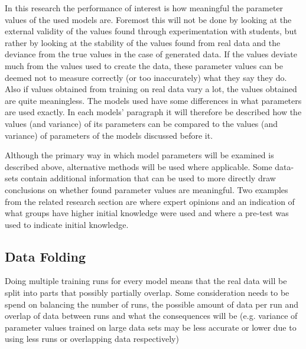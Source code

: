 \documentclass{article}
\begin{document}
\begin{comment}
Since the learner models are also used as an approximation of how students learn and as such influence decisions made on what exercises are given to a student, what exercises are included in general and what topics require more attention, the validity of the specific parameters of the model need to taken into account. In this research external validity (e.g. see if the parameter settings seem realistic) is not the concern, but rather whether the found parameters are consistent over multiple trainings of the model and (in the case of generated data) whether the training algorithm recovers the used parameters correctly.
\end{comment}

In this research the performance of interest is how meaningful the parameter values of the used models are. Foremost this will not be done by looking at the external validity of the values found through experimentation with students, but rather by looking at the stability of the values found from real data and the deviance from the true values in the case of generated data. If the values deviate much from the values used to create the data, these parameter values can be deemed not to measure correctly (or too inaccurately) what they say they do. Also if values obtained from training on real data vary a lot, the values obtained are quite meaningless. The models used have some differences in what parameters are used exactly. In each models' paragraph it will therefore be described how the values (and variance) of its parameters can be compared to the values (and variance) of parameters of the models discussed before it.

Although the primary way in which model parameters will be examined is described above, alternative methods will be used where applicable. Some data-sets contain additional information that can be used to more directly draw conclusions on whether found parameter values are meaningful. Two examples from the related research section are \cite{eirt} where expert opinions and an indication of what groups have higher initial knowledge were used and \cite{ktpfa} where a pre-test was used to indicate initial knowledge.

\subsection{Data Folding}
Doing multiple training runs for every model means that the real data will be split into parts that possibly partially overlap. Some consideration needs to be spend on balancing the number of runs, the possible amount of data per run and overlap of data between runs and what the consequences will be (e.g. variance of parameter values trained on large data sets may be less accurate or lower due to using less runs or overlapping data respectively)
\end{document}
